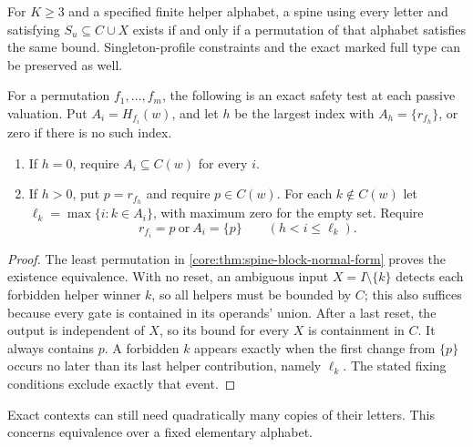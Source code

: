 \begin{corollary}
\label{core:cor:spine-permutation-safety}
For $K\geq3$ and a specified finite helper alphabet, a spine using every letter and
satisfying $S_u\subseteq C\cup X$ exists if and only if a permutation
of that alphabet satisfies the same bound. Singleton-profile constraints
and the exact marked full type can be preserved as well.

For a permutation $f_1,\ldots,f_m$, the following is an exact safety test
at each passive valuation. Put $A_i=H_{f_i}(w)$, and let $h$ be the largest
index with $A_h=\{r_{f_h}\}$, or zero if there is no such index.
\begin{enumerate}
\item If $h=0$, require $A_i\subseteq C(w)$ for every $i$.
\item If $h>0$, put $p=r_{f_h}$ and require $p\in C(w)$. For each
  $k\notin C(w)$ let $\ell_k=\max\{i:k\in A_i\}$, with maximum zero
  for the empty set. Require
  \[
   r_{f_i}=p\ \text{or}\ A_i=\{p\}
   \qquad(h<i\leq\ell_k).
  \]
\end{enumerate}
\end{corollary}
\begin{proof}
The least permutation in \cref{core:thm:spine-block-normal-form} proves
the existence equivalence. With no reset, an ambiguous input
$X=I\setminus\{k\}$ detects each forbidden helper winner $k$, so all
helpers must be bounded by $C$; this also suffices because every gate is
contained in its operands' union. After a last reset, the output is
independent of $X$, so its bound for every $X$ is containment in $C$.
It always contains $p$. A forbidden $k$ appears exactly when the first change from $\{p\}$
occurs no later than its last helper contribution, namely $\ell_k$.
The stated fixing conditions exclude exactly that event.
\end{proof}

Exact contexts can still need quadratically many copies of their letters.
This concerns equivalence over a fixed elementary alphabet.

